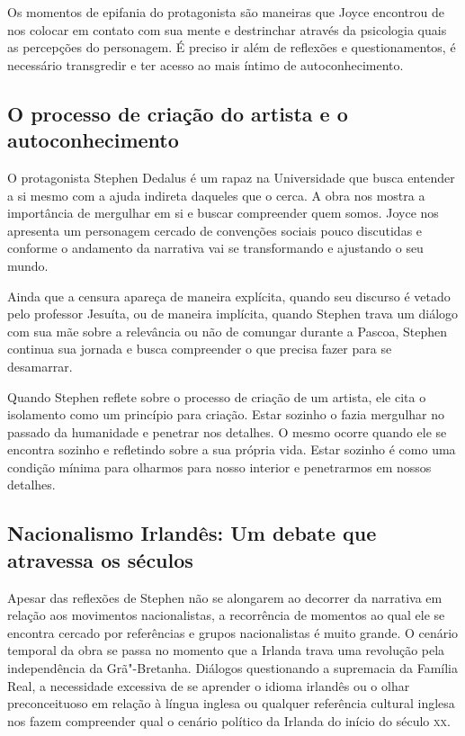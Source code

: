 \documentclass[12pt]{extarticle}
\begin{document}
{Os momentos de epifania do protagonista são maneiras que Joyce encontrou
de nos colocar em contato com sua mente e destrinchar através da
psicologia quais as percepções do personagem. É preciso ir além de
reflexões e questionamentos, é necessário transgredir e ter acesso ao
mais íntimo de autoconhecimento.

\subsection{O processo de criação do artista e o autoconhecimento}

O protagonista Stephen Dedalus é um rapaz na Universidade que busca
entender a si mesmo com a ajuda indireta daqueles que o cerca. A obra
nos mostra a importância de mergulhar em si e buscar compreender quem
somos. Joyce nos apresenta um personagem cercado de convenções sociais
pouco discutidas e conforme o andamento da narrativa vai se
transformando e ajustando o seu mundo.

Ainda que a censura apareça de maneira explícita, quando seu discurso é
vetado pelo professor Jesuíta, ou de maneira implícita, quando Stephen
trava um diálogo com sua mãe sobre a relevância ou não de comungar
durante a Pascoa, Stephen continua sua jornada e busca compreender o que
precisa fazer para se desamarrar.

Quando Stephen reflete sobre o processo de criação de um artista, ele
cita o isolamento como um princípio para criação. Estar sozinho o fazia
mergulhar no passado da humanidade e penetrar nos detalhes. O mesmo
ocorre quando ele se encontra sozinho e refletindo sobre a sua própria
vida. Estar sozinho é como uma condição mínima para olharmos para nosso
interior e penetrarmos em nossos detalhes.

\subsection{Nacionalismo Irlandês: Um debate que atravessa os séculos }

Apesar das reflexões de Stephen não se alongarem ao decorrer da
narrativa em relação aos movimentos nacionalistas, a recorrência de
momentos ao qual ele se encontra cercado por referências e grupos
nacionalistas é muito grande. O cenário temporal da obra se passa no
momento que a Irlanda trava uma revolução pela independência da
Grã"-Bretanha. Diálogos questionando a supremacia da Família Real, a
necessidade excessiva de se aprender o idioma irlandês ou o olhar
preconceituoso em relação à língua inglesa ou qualquer referência
cultural inglesa nos fazem compreender qual o cenário político da
Irlanda do início do século \textsc{xx}.

}
\end{document}
